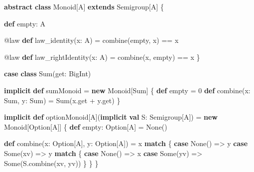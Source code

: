 \documentclass[
  ignorenonframetext,
]{beamer}
\newenvironment{Shaded}{}{}
\newcommand{\DecValTok}[1]{\textcolor[rgb]{0.25,0.63,0.44}{#1}}
\newcommand{\FunctionTok}[1]{\textcolor[rgb]{0.02,0.16,0.49}{#1}}
\newcommand{\KeywordTok}[1]{\textcolor[rgb]{0.00,0.44,0.13}{\textbf{#1}}}
\newcommand{\NormalTok}[1]{#1}
\begin{document}
\begin{frame}[fragile]

\begin{Shaded}
\begin{Highlighting}[]
\KeywordTok{abstract} \KeywordTok{class}\NormalTok{ Monoid[A]}
  \KeywordTok{extends}\NormalTok{ Semigroup[A] \{}

  \KeywordTok{def}\NormalTok{ empty: A}

\NormalTok{  @law }\KeywordTok{def} \FunctionTok{law_identity}\NormalTok{(x: A) =}
    \FunctionTok{combine}\NormalTok{(empty, x) == x}

\NormalTok{  @law }\KeywordTok{def} \FunctionTok{law_rightIdentity}\NormalTok{(x: A) =}
    \FunctionTok{combine}\NormalTok{(x, empty) == x}
\NormalTok{\}}
\end{Highlighting}
\end{Shaded}

\end{frame}

\begin{frame}[fragile]

\begin{Shaded}
\begin{Highlighting}[]
\KeywordTok{case} \KeywordTok{class} \FunctionTok{Sum}\NormalTok{(get: BigInt)}

\KeywordTok{implicit} \KeywordTok{def}\NormalTok{ sumMonoid = }\KeywordTok{new}\NormalTok{ Monoid[Sum] \{}
  \KeywordTok{def}\NormalTok{ empty = }\DecValTok{0}
  \KeywordTok{def} \FunctionTok{combine}\NormalTok{(x: Sum, y: Sum) = }\FunctionTok{Sum}\NormalTok{(x.}\FunctionTok{get}\NormalTok{ + y.}\FunctionTok{get}\NormalTok{)}
\NormalTok{\}}
\end{Highlighting}
\end{Shaded}

\end{frame}

\begin{frame}[fragile]

\begin{Shaded}
\begin{Highlighting}[]
\KeywordTok{implicit} \KeywordTok{def}\NormalTok{ optionMonoid[A](}\KeywordTok{implicit} \KeywordTok{val}\NormalTok{ S: Semigroup[A]) =}
  \KeywordTok{new}\NormalTok{ Monoid[Option[A]] \{}
    \KeywordTok{def}\NormalTok{ empty: Option[A] = None()}

    \KeywordTok{def} \FunctionTok{combine}\NormalTok{(x: Option[A], y: Option[A]) =}
\NormalTok{      x }\KeywordTok{match}\NormalTok{ \{}
        \KeywordTok{case}\NormalTok{ None() => y}
        \KeywordTok{case}\NormalTok{ Some(xv) => y }\KeywordTok{match}\NormalTok{ \{}
          \KeywordTok{case}\NormalTok{ None() => x}
          \KeywordTok{case}\NormalTok{ Some(yv) => Some(S.}\FunctionTok{combine}\NormalTok{(xv, yv))}
\NormalTok{        \}}
\NormalTok{      \}}
\NormalTok{  \}}
\end{Highlighting}
\end{Shaded}

\end{frame}
\end{document}
